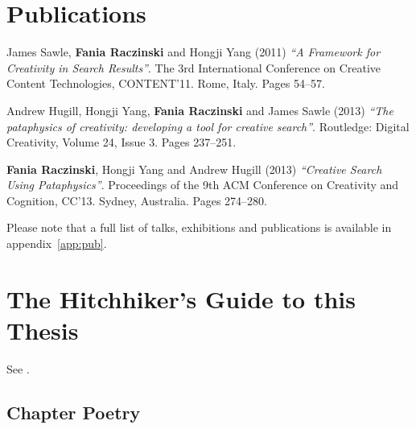 \begin{comment}
  abusing tech in creative ways can yield useful results
  pataphysics = Creativity

  combining the pseudo philosophy of pataphysics with sematically structured algorithms which use programming APIs and computational linguistics to produce original creative works.

  overturn expectations
  subvert browsing
  undermine relevance
  corrupt results
\end{comment}


\section{Publications}

James Sawle, \textbf{Fania Raczinski} and Hongji Yang (2011) \emph{``A Framework for Creativity in Search Results''}. The 3rd International Conference on Creative Content Technologies, CONTENT'11. Rome, Italy. Pages 54--57.

Andrew Hugill, Hongji Yang, \textbf{Fania Raczinski} and James Sawle (2013) \emph{``The pataphysics of creativity: developing a tool for creative search''}. Routledge: Digital Creativity, Volume 24, Issue 3. Pages 237--251.

\textbf{Fania Raczinski}, Hongji Yang and Andrew Hugill (2013) \emph{``Creative Search Using Pataphysics''}. Proceedings of the 9th ACM Conference on Creativity and Cognition, CC'13. Sydney, Australia. Pages 274--280.

Please note that a full list of talks, exhibitions and publications is available in appendix~\ref{app:pub}.


\section{The Hitchhiker's Guide to this Thesis}

See .

%   

% 

\subsection*{Chapter Poetry}

